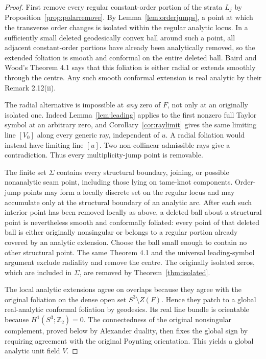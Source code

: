\documentclass[aps,prd,reprint,nofootinbib,superscriptaddress]{revtex4-2}
\theoremstyle{definition}
\theoremstyle{remark}
\begin{document}
\begin{proof}
First remove every regular constant-order portion of the strata $L_j$ by Proposition~\ref{prop:polarremove}. By Lemma~\ref{lem:orderjumps}, a point at which the transverse order changes is isolated within the regular analytic locus. In a sufficiently small deleted geodesically convex ball around such a point, all adjacent constant-order portions have already been analytically removed, so the extended foliation is smooth and conformal on the entire deleted ball. Baird and Wood's Theorem 4.1 \cite{BairdWood1991} says that this foliation is either radial or extends smoothly through the centre.  Any such smooth conformal extension is real analytic by their Remark 2.12(ii).

The radial alternative is impossible at \emph{any} zero of $F$, not only at an originally isolated one. Indeed Lemma~\ref{lem:leading} applies to the first nonzero full Taylor symbol at an arbitrary zero, and Corollary~\ref{cor:raylimit} gives the same limiting line $[V_0]$ along every generic ray, independent of $u$. A radial foliation would instead have limiting line $[u]$. Two non-collinear admissible rays give a contradiction. Thus every multiplicity-jump point is removable.

The finite set $\Sigma$ contains every structural boundary, joining, or possible nonanalytic seam point, including those lying on tame-knot components.  Order-jump points may form a locally discrete set on the regular locus and may accumulate only at the structural boundary of an analytic arc.  After each such interior point has been removed locally as above, a deleted ball about a structural point is nevertheless smooth and conformally foliated: every point of that deleted ball is either originally nonsingular or belongs to a regular portion already covered by an analytic extension.  Choose the ball small enough to contain no other structural point.  The same Theorem 4.1 and the universal leading-symbol argument exclude radiality and remove the centre.  The originally isolated zeros, which are included in $\Sigma$, are removed by Theorem~\ref{thm:isolated}.

The local analytic extensions agree on overlaps because they agree with the original foliation on the dense open set $S^3\setminus Z(F)$. Hence they patch to a global real-analytic conformal foliation by geodesics. Its real line bundle is orientable because $H^1(S^3;\mathbb Z_2)=0$.  The connectedness of the original nonsingular complement, proved below by Alexander duality, then fixes the global sign by requiring agreement with the original Poynting orientation. This yields a global analytic unit field $V$.
\end{proof}
\end{document}

